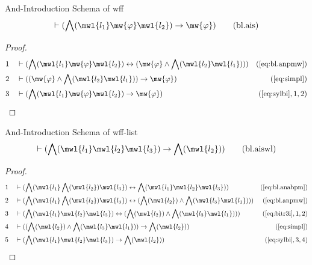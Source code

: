 \begin{lemma} {And-Introduction Schema of wff}
\begin{align}
\vdash ( \bigwedge( \mwl{l_1} \mw{\varphi} \mwl{l_2} ) \rightarrow \mw{\varphi}
    )\label{eq:bl.ais}\tag{bl.ais}
\end{align}
\end{lemma}


\begin{proof}
\begin{align}
  1 &&  & \vdash ( \bigwedge( \mwl{l_1} \mw{\varphi} \mwl{l_2} )
     \leftrightarrow ( \mw{\varphi} \wedge \bigwedge(
     \mwl{l_2} \mwl{l_1} ) )
     )&(\mbox{\ref{eq:bl.anpmw}})\notag
  \\ 2 &&  & \vdash ( ( \mw{\varphi} \wedge \bigwedge( \mwl{l_2} \mwl{l_1} ) )
     \rightarrow \mw{\varphi}
     )&(\mbox{\ref{eq:simpl}})\notag
  \\ 3 &&  & \vdash ( \bigwedge( \mwl{l_1} \mw{\varphi} \mwl{l_2} ) \rightarrow
     \mw{\varphi} )&(\mbox{\ref{eq:sylbi}},1,2)\notag
\end{align}
\end{proof}

\begin{lemma} {And-Introduction Schema of wff-list}
\begin{align}
\vdash ( \bigwedge( \mwl{l_1} \mwl{l_2} \mwl{l_3} ) \rightarrow \bigwedge(
    \mwl{l_2} ) )\label{eq:bl.aiswl}\tag{bl.aiswl}
\end{align}
\end{lemma}


\begin{proof}
\begin{align}
  1 &&  & \vdash ( \bigwedge( \mwl{l_1} \bigwedge( \mwl{l_2} ) \mwl{l_3} )
     \leftrightarrow \bigwedge( \mwl{l_1} \mwl{l_2}
     \mwl{l_3} ) )&(\mbox{\ref{eq:bl.anabpm}})\notag
  \\ 2 &&  & \vdash ( \bigwedge( \mwl{l_1} \bigwedge( \mwl{l_2} ) \mwl{l_3} )
     \leftrightarrow ( \bigwedge( \mwl{l_2} ) \wedge
     \bigwedge( \mwl{l_3} \mwl{l_1} ) )
     )&(\mbox{\ref{eq:bl.anpmw}})\notag
  \\ 3 &&  & \vdash ( \bigwedge( \mwl{l_1} \mwl{l_2} \mwl{l_3} )
     \leftrightarrow ( \bigwedge( \mwl{l_2} ) \wedge
     \bigwedge( \mwl{l_3} \mwl{l_1} ) )
     )&(\mbox{\ref{eq:bitr3i}},1,2)\notag
  \\ 4 &&  & \vdash ( ( \bigwedge( \mwl{l_2} ) \wedge \bigwedge( \mwl{l_3}
     \mwl{l_1} ) ) \rightarrow \bigwedge( \mwl{l_2} )
     )&(\mbox{\ref{eq:simpl}})\notag
  \\ 5 &&  & \vdash ( \bigwedge( \mwl{l_1} \mwl{l_2} \mwl{l_3} ) \rightarrow
     \bigwedge( \mwl{l_2} )
     )&(\mbox{\ref{eq:sylbi}},3,4)\notag
\end{align}
\end{proof}

